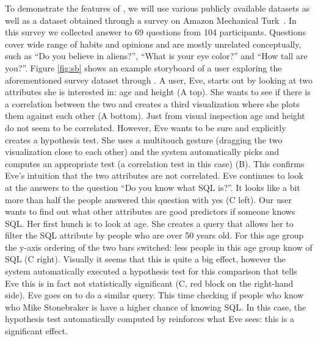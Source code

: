 To demonstrate the features of \system{}, we will use various publicly available datasets as well as a dataset obtained through a survey on Amazon Mechanical Turk~\cite{binnig2017sustainable}. In this survey we collected answer to 69 questions from 104 participants. Questions cover wide range of habits and opinions and are mostly unrelated conceptually, such as ``Do you believe in aliens?'',  ``What is your eye color?'' and ``How tall are you?''. 
Figure \ref{fig:sb} shows an example storyboard of a user exploring the aforementioned survey dataset through \system{}. A user, Eve, starts out by looking at two attributes she is interested in: age and height (A top). She wants to see if there is a correlation between the two and creates a third visualization where she plots them against each other (A bottom). Just from visual inspection age and height do not seem to be correlated. However, Eve wants to be sure and explicitly creates a hypothesis test. She uses a multitouch gesture (dragging the two visualization close to each other) and the system automatically picks and computes an appropriate test (a correlation test in this case) (B). This confirms Eve's intuition that the two attributes are not correlated. Eve continues to look at the answers to the question ``Do you know what SQL is?''. It looks like a bit more than half the people answered this question with yes (C left). Our user wants to find out what other attributes are good predictors if someone knows SQL. Her first hunch is to look at age. She creates a query that allows her to filter the SQL attribute by people who are over 50 years old. For this age group the y-axis ordering of the two bars switched: less people in this age group know of SQL (C right). Visually it seems that this is quite a big effect, however the system automatically executed a hypothesis test for this comparison that tells Eve this is in fact not statistically significant (C, red block on the right-hand side). Eve goes on to do a similar query. This time checking if people who know who Mike Stonebraker is have a higher chance of knowing SQL. In this case, the hypothesis test automatically computed by \system{} reinforces what Eve sees: this is a significant effect. 


